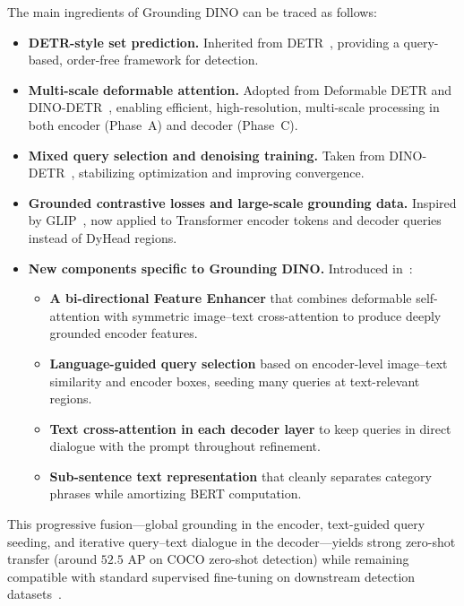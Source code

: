 \begin{enrichment}
\begin{enrichment}[Method][subsection]
		The main ingredients of Grounding DINO can be traced as follows:
		\begin{itemize}
			\item \textbf{DETR-style set prediction.} Inherited from DETR~\cite{carion2020_detr}, providing a query-based, order-free framework for detection.
			\item \textbf{Multi-scale deformable attention.} Adopted from Deformable DETR and DINO-DETR~\cite{zhu2021_deformabledetr,zhang2022_dino}, enabling efficient, high-resolution, multi-scale processing in both encoder (Phase~A) and decoder (Phase~C).
			\item \textbf{Mixed query selection and denoising training.} Taken from DINO-DETR~\cite{zhang2022_dino}, stabilizing optimization and improving convergence.
			\item \textbf{Grounded contrastive losses and large-scale grounding data.} Inspired by GLIP~\cite{li2022_glip}, now applied to Transformer encoder tokens and decoder queries instead of DyHead regions.
			\item \textbf{New components specific to Grounding DINO.} Introduced in~\cite{liu2023_groundingdino}:
			\begin{itemize}
				\item \textbf{A bi-directional Feature Enhancer} that combines deformable self-attention with symmetric image--text cross-attention to produce deeply grounded encoder features.
				\item \textbf{Language-guided query selection} based on encoder-level image--text similarity and encoder boxes, seeding many queries at text-relevant regions.
				\item \textbf{Text cross-attention in each decoder layer} to keep queries in direct dialogue with the prompt throughout refinement.
				\item \textbf{Sub-sentence text representation} that cleanly separates category phrases while amortizing BERT computation.
			\end{itemize}
		\end{itemize}
		This progressive fusion---global grounding in the encoder, text-guided query seeding, and iterative query–text dialogue in the decoder---yields strong zero-shot transfer (around \(52.5\) AP on COCO zero-shot detection) while remaining compatible with standard supervised fine-tuning on downstream detection datasets~\cite{liu2023_groundingdino}.
		
	\end{enrichment}
	

\end{enrichment}
